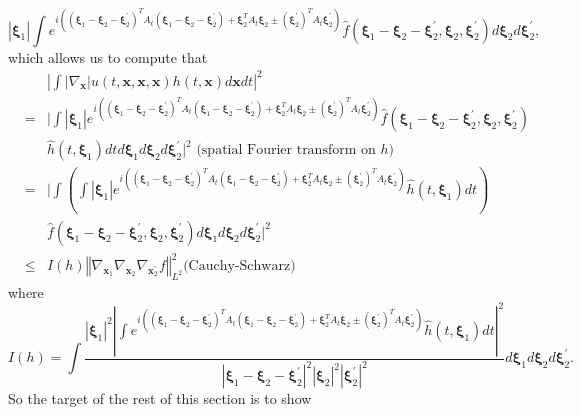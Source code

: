 \documentclass[reqno]{amsart}
\theoremstyle{plain}
\numberwithin{equation}{section}
\begin{document}
\begin{equation*}
\left\vert \mathbf{\xi }_{1}\right\vert \int e^{i(\left( \mathbf{\xi }_{1}-\mathbf{\xi }_{2}-\mathbf{\xi }_{2}^{\prime }\right) ^{T}A_{t}\left( \mathbf{\xi }_{1}-\mathbf{\xi }_{2}-\mathbf{\xi }_{2}^{\prime }\right) +\mathbf{\xi }_{2}^{T}A_{t}\mathbf{\xi }_{2}\pm \left( \mathbf{\xi }_{2}^{\prime }\right)
^{T}A_{t}\mathbf{\xi }_{2}^{\prime })}\hat{f}(\mathbf{\xi }_{1}-\mathbf{\xi }_{2}-\mathbf{\xi }_{2}^{\prime },\mathbf{\xi }_{2},\mathbf{\xi }_{2}^{\prime
})d\mathbf{\xi }_{2}d\mathbf{\xi }_{2}^{\prime },
\end{equation*}which allows us to compute that\begin{eqnarray*}
&&\left\vert \int \left\vert \nabla _{\mathbf{x}}\right\vert u(t,\mathbf{x},\mathbf{x},\mathbf{x})h(t,\mathbf{x})d\mathbf{x}dt\right\vert ^{2} \\
&=&\bigg|\int \left\vert \mathbf{\xi }_{1}\right\vert e^{i(\left( \mathbf{\xi }_{1}-\mathbf{\xi }_{2}-\mathbf{\xi }_{2}^{\prime }\right)
^{T}A_{t}\left( \mathbf{\xi }_{1}-\mathbf{\xi }_{2}-\mathbf{\xi }_{2}^{\prime }\right) +\mathbf{\xi }_{2}^{T}A_{t}\mathbf{\xi }_{2}\pm \left( 
\mathbf{\xi }_{2}^{\prime }\right) ^{T}A_{t}\mathbf{\xi }_{2}^{\prime })}\hat{f}(\mathbf{\xi }_{1}-\mathbf{\xi }_{2}-\mathbf{\xi }_{2}^{\prime },\mathbf{\xi }_{2},\mathbf{\xi }_{2}^{\prime }) \\
&&\hat{h}(t,\mathbf{\xi }_{1})dtd\mathbf{\xi }_{1}d\mathbf{\xi }_{2}d\mathbf{\xi }_{2}^{\prime }\bigg|^{2}\text{ (spatial Fourier transform on }h\text{)}
\\
&=&\bigg|\int \left( \int \left\vert \mathbf{\xi }_{1}\right\vert
e^{i(\left( \mathbf{\xi }_{1}-\mathbf{\xi }_{2}-\mathbf{\xi }_{2}^{\prime
}\right) ^{T}A_{t}\left( \mathbf{\xi }_{1}-\mathbf{\xi }_{2}-\mathbf{\xi }_{2}^{\prime }\right) +\mathbf{\xi }_{2}^{T}A_{t}\mathbf{\xi }_{2}\pm \left( 
\mathbf{\xi }_{2}^{\prime }\right) ^{T}A_{t}\mathbf{\xi }_{2}^{\prime })}\hat{h}(t,\mathbf{\xi }_{1})dt\right) \\
&&\hat{f}(\mathbf{\xi }_{1}-\mathbf{\xi }_{2}-\mathbf{\xi }_{2}^{\prime },\mathbf{\xi }_{2},\mathbf{\xi }_{2}^{\prime })d\mathbf{\xi }_{1}d\mathbf{\xi 
}_{2}d\mathbf{\xi }_{2}^{\prime }\bigg|^{2} \\
&\leqslant &I(h)\left\Vert \nabla _{\mathbf{x}_{1}}\nabla _{\mathbf{x}_{2}}\nabla _{\mathbf{x}_{2}^{\prime }}f\right\Vert _{L^{2}}^{2}\text{
(Cauchy-Schwarz)}
\end{eqnarray*}where\begin{equation*}
I(h)=\int \frac{\left\vert \mathbf{\xi }_{1}\right\vert ^{2}\left\vert \int
e^{i(\left( \mathbf{\xi }_{1}-\mathbf{\xi }_{2}-\mathbf{\xi }_{2}^{\prime
}\right) ^{T}A_{t}\left( \mathbf{\xi }_{1}-\mathbf{\xi }_{2}-\mathbf{\xi }_{2}^{\prime }\right) +\mathbf{\xi }_{2}^{T}A_{t}\mathbf{\xi }_{2}\pm \left( 
\mathbf{\xi }_{2}^{\prime }\right) ^{T}A_{t}\mathbf{\xi }_{2}^{\prime })}\hat{h}(t,\mathbf{\xi }_{1})dt\right\vert ^{2}}{\left\vert \mathbf{\xi }_{1}-\mathbf{\xi }_{2}-\mathbf{\xi }_{2}^{\prime }\right\vert ^{2}\left\vert 
\mathbf{\xi }_{2}\right\vert ^{2}\left\vert \mathbf{\xi }_{2}^{\prime
}\right\vert ^{2}}d\mathbf{\xi }_{1}d\mathbf{\xi }_{2}d\mathbf{\xi }_{2}^{\prime }.
\end{equation*}So the target of the rest of this section is to show 
\end{document}
